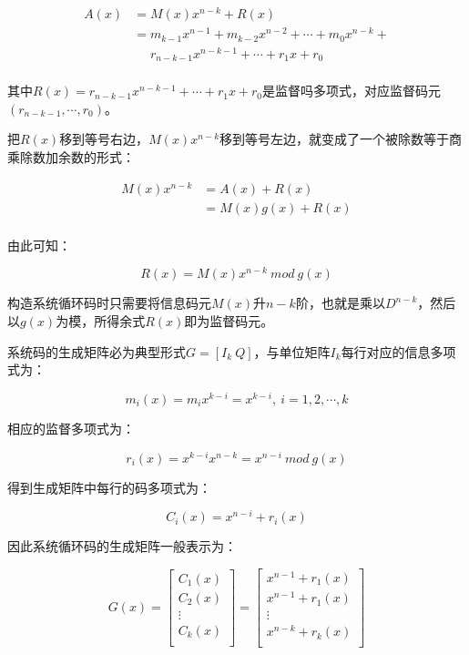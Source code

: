 \documentclass[
]{article}
\begin{document}
\begin{equation}
\begin{aligned}
A(x)&=M(x)x^{n-k}+R(x)\\
    &=m_{k-1}x^{n-1}+m_{k-2}x^{n-2}+\cdots+m_0x^{n-k}+\\
    & \: \: \: \: \: \:  r_{n-k-1}x^{n-k-1}+\cdots+r_1x+r_0\\
\end{aligned}
\end{equation}

其中$R(x)=r_{n-k-1}x^{n-k-1}+\cdots+r_1x+r_0$是监督吗多项式，对应监督码元$(r_{n-k-1},\cdots,r_{0})$。

把$R(x)$移到等号右边，$M(x)x^{n-k}$移到等号左边，就变成了一个被除数等于商乘除数加余数的形式：

\begin{equation}
\begin{aligned}
M(x)x^{n-k}&=A(x)+R(x)\\
    	&=M(x)g(x)+R(x)\\
\end{aligned}
\end{equation}

由此可知：

\begin{equation}
R(x)=M(x)x^{n-k} \: mod \: g(x)
\end{equation}

构造系统循环码时只需要将信息码元$M(x)$升$n-k$阶，也就是乘以$D^{n-k}$，然后以$g(x)$为模，所得余式$R(x)$即为监督码元。

系统码的生成矩阵必为典型形式$G=[I_k \: Q]$，与单位矩阵$I_k$每行对应的信息多项式为：

\begin{equation}
m_i(x)=m_ix^{k-i}=x^{k-i},\: i=1,2,\cdots,k
\end{equation}

相应的监督多项式为：

\begin{equation}
r_i(x)=x^{k-i}x^{n-k}=x^{n-i}\: mod \: g(x)
\end{equation}

得到生成矩阵中每行的码多项式为：

\begin{equation}
C_i(x)=x^{n-i}+r_i(x)
\end{equation}

因此系统循环码的生成矩阵一般表示为：

\begin{equation}
G(x)=
\left[
\begin{matrix}
C_1(x)\\
C_2(x)\\
 \vdots \\
C_k(x)\\
\end{matrix}
\right]
=
\left[
\begin{matrix}
x^{n-1}+r_1(x)\\
x^{n-1}+r_1(x)\\
 \vdots \\
x^{n-k}+r_k(x)\\
\end{matrix}
\right]
\end{equation}
\end{document}
